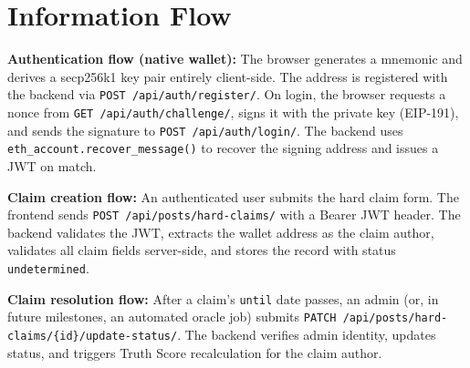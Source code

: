 \documentclass[a4paper,12pt]{report}
\begin{document}
\section{Information Flow}

\textbf{Authentication flow (native wallet):} The browser generates a mnemonic and derives a secp256k1 key pair entirely client-side. The address is registered with the backend via \texttt{POST /api/auth/register/}. On login, the browser requests a nonce from \texttt{GET /api/auth/challenge/}, signs it with the private key (EIP-191), and sends the signature to \texttt{POST /api/auth/login/}. The backend uses \texttt{eth\_account.recover\_message()} to recover the signing address and issues a JWT on match.

\textbf{Claim creation flow:} An authenticated user submits the hard claim form. The frontend sends \texttt{POST /api/posts/hard-claims/} with a Bearer JWT header. The backend validates the JWT, extracts the wallet address as the claim author, validates all claim fields server-side, and stores the record with status \texttt{undetermined}.

\textbf{Claim resolution flow:} After a claim's \texttt{until} date passes, an admin (or, in future milestones, an automated oracle job) submits \texttt{PATCH /api/}\allowbreak\texttt{posts/hard-claims/}\allowbreak\texttt{\{id\}/update-status/}. The backend verifies admin identity, updates status, and triggers Truth Score recalculation for the claim author.
\end{document}
